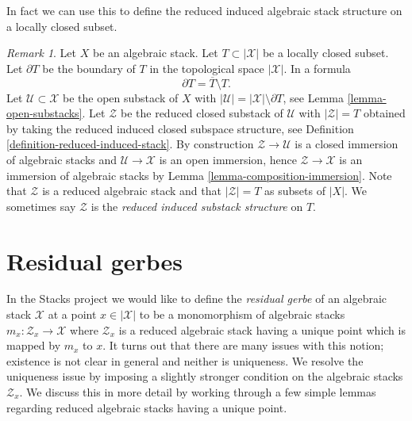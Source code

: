 \documentclass{stacks-project}
\theoremstyle{plain}
\theoremstyle{definition}
\theoremstyle{remark}
\newtheorem{remark}[subsection]{Remark}
\numberwithin{equation}{subsection}
\begin{document}
\noindent
In fact we can use this to define the reduced induced algebraic
stack structure on a locally closed subset.

\begin{remark}
\label{remark-stack-structure-locally-closed-subset}
Let $X$ be an algebraic stack.
Let $T \subset |\mathcal{X}|$ be a locally closed subset.
Let $\partial T$ be the boundary of $T$ in
the topological space $|\mathcal{X}|$. In a formula
$$
\partial T = \overline{T} \setminus T.
$$
Let $\mathcal{U} \subset \mathcal{X}$ be the open substack of $X$ with
$|\mathcal{U}| = |\mathcal{X}| \setminus \partial T$, see
Lemma \ref{lemma-open-substacks}.
Let $\mathcal{Z}$ be the reduced closed substack of $\mathcal{U}$ with
$|\mathcal{Z}| = T$ obtained by taking the reduced induced
closed subspace structure, see
Definition \ref{definition-reduced-induced-stack}.
By construction $\mathcal{Z} \to \mathcal{U}$ is a closed immersion of
algebraic stacks and $\mathcal{U} \to \mathcal{X}$ is an open immersion,
hence $\mathcal{Z} \to \mathcal{X}$ is an immersion of algebraic stacks by
Lemma \ref{lemma-composition-immersion}.
Note that $\mathcal{Z}$ is a reduced algebraic stack and that
$|\mathcal{Z}| = T$ as subsets of $|X|$. We sometimes say
$\mathcal{Z}$ is the {\it reduced induced substack structure} on $T$.
\end{remark}













\section{Residual gerbes}
\label{section-residual-gerbe}

\noindent
In the Stacks project we would like to define the {\it residual gerbe}
of an algebraic stack $\mathcal{X}$ at a point $x \in |\mathcal{X}|$
to be a monomorphism of algebraic stacks
$m_x : \mathcal{Z}_x \to \mathcal{X}$ where $\mathcal{Z}_x$ is a reduced
algebraic stack having a unique point which is mapped by $m_x$ to $x$.
It turns out that there are many issues with this notion; existence is not
clear in general and neither is uniqueness.
We resolve the uniqueness issue by imposing a slightly stronger
condition on the algebraic stacks $\mathcal{Z}_x$.
We discuss this in more detail by working through a few simple lemmas
regarding reduced algebraic stacks having a unique point.
\end{document}
